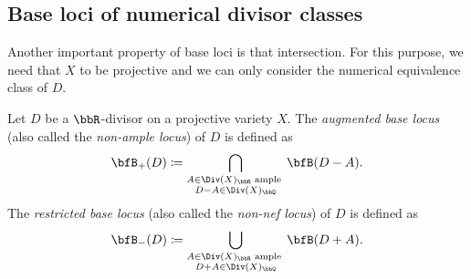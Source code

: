 
    \Yang{}



\subsection{Base loci of numerical divisor classes}

  Another important property of base loci is that intersection.
  For this purpose, we need that $X$ to be projective and we can only consider the numerical equivalence class of $D$.




  \begin{definition}
    Let $D$ be a $\bbR$-divisor on a projective variety $X$.
    The \emph{augmented base locus} (also called the \emph{non-ample locus}) of $D$ is defined as
    \[ \bfB_+(D) \coloneqq \bigcap_{\substack{A \in \Div(X)_\bbR \text{ ample } \\ D - A \in \Div(X)_\bbQ}} \bfB(D - A). \]
    The \emph{restricted base locus} (also called the \emph{non-nef locus}) of $D$ is defined as
    \[ \bfB_-(D) \coloneqq \bigcup_{\substack{A \in \Div(X)_\bbR \text{ ample } \\ D + A \in \Div(X)_\bbQ}} \bfB(D + A). \]
    \Yang{}
  \end{definition}

